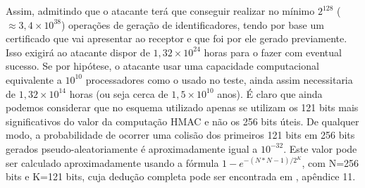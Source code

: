 Assim, admitindo que o atacante terá que conseguir realizar no mínimo $2^{128}$  ($\approx 3,4 \times 10^{38}$)
operações de geração de identificadores, tendo por base um certificado que vai apresentar ao receptor e que foi por ele gerado previamente.
Isso exigirá ao atacante dispor de $1,32\times10^{24}$ horas para o fazer com eventual sucesso. Se por hipótese, o atacante usar uma
capacidade computacional equivalente a $10^{10}$ processadores como o usado no teste, ainda assim necessitaria de
$1,32\times10^{14}$ horas (ou seja cerca de $1,5 \times 10^{10}$ anos). É claro que ainda podemos considerar
que no esquema utilizado apenas se utilizam os 121 bits mais significativos do valor da computação HMAC
e não os 256 bits úteis. De qualquer modo, a probabilidade de ocorrer uma colisão dos primeiros 121
bits em 256 bits gerados pseudo-aleatoriamente é aproximadamente igual a $10^{-32}$. Este valor
pode ser  calculado aproximadamente usando a fórmula
$1-e^{-(N*N-1)/2^K}$, com N=256 bits e K=121 bits, cuja dedução completa pode
ser encontrada em \cite{stallings_computer_2014}, apêndice 11.




